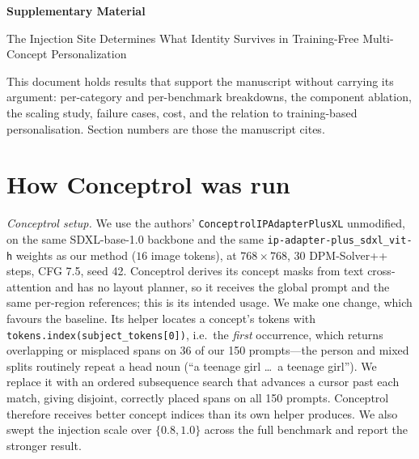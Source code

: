 \documentclass[review,10pt,times]{elsarticle}
\begin{document}
\begin{center}
  {\large\bfseries Supplementary Material\par}
  \vspace{4pt}
  {\normalsize The Injection Site Determines What Identity Survives in
   Training-Free Multi-Concept Personalization\par}
\end{center}

\vspace{6pt}
\noindent
This document holds results that support the manuscript without carrying its
argument: per-category and per-benchmark breakdowns, the component ablation,
the scaling study, failure cases, cost, and the relation to training-based
personalisation.  Section numbers are those the manuscript cites.

\linenumbers

\section{How Conceptrol was run}
\noindent\textit{Conceptrol setup.}
\label{sec:conceptrol_setup}
We use the authors' \texttt{Conceptrol\allowbreak IPAdapter\allowbreak Plus\allowbreak XL} unmodified, on the same
SDXL-base-1.0 backbone and the same \texttt{ip-adapter-plus\_sdxl\_vit-h}
weights as our method ($16$ image tokens), at $768\!\times\!768$, 30
DPM-Solver++ steps, CFG 7.5, seed 42.  Conceptrol derives its concept masks
from text cross-attention and has no layout planner, so it receives the global
prompt and the same per-region references; this is its intended usage.  We make
one change, which favours the baseline.  Its helper locates a concept's tokens
with \texttt{tokens.index(subject\_tokens[0])}, i.e.\ the \emph{first}
occurrence, which returns overlapping or misplaced spans on 36 of our 150
prompts---the person and mixed splits routinely repeat a head noun (``a teenage
girl \ldots\ a teenage girl'').  We replace it with an ordered subsequence
search that advances a cursor past each match, giving disjoint, correctly
placed spans on all 150 prompts.  Conceptrol therefore receives better concept
indices than its own helper produces.  We also swept the injection scale over
$\{0.8, 1.0\}$ across the full benchmark and report the stronger result.
\end{document}
